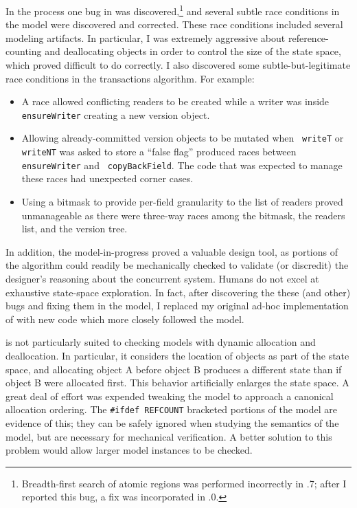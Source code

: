 In the process one bug in \Spin was discovered,\footnote{Breadth-first
search of atomic regions was performed incorrectly in .7;
after I reported this bug, a fix was incorporated in .0.}
and several subtle race conditions in the model were discovered and
corrected.  These race conditions included several modeling artifacts.
In particular, I was extremely aggressive about reference-counting and
deallocating objects in order to control the size of the state space,
which proved difficult to do correctly.  I also discovered some
subtle-but-legitimate race conditions in the transactions algorithm.
For example:
\begin{itemize}
\item A race allowed conflicting readers to be created while a writer
  was inside {\tt ensureWriter} creating a new version object.
\item Allowing already-committed version objects to be mutated when {\tt
    writeT} or {\tt writeNT} was asked to store a ``false flag'' produced
  races between {\tt ensureWriter} and {\tt
    copyBackField}.  The code that was expected to manage these races
  had unexpected corner cases.
\item Using a bitmask to provide per-field granularity
  to the list of readers proved unmanageable as there were three-way
  races among the bitmask, the readers list, and the version tree.
\end{itemize}
In addition, the model-in-progress proved a valuable design tool, as
portions of the algorithm could readily be mechanically checked to
validate (or discredit) the designer's reasoning about the concurrent
system.  Humans do not excel at exhaustive state-space exploration.
In fact, after discovering the these (and other) bugs and fixing them in the
model, I replaced my original ad-hoc implementation of \apex with new
code which more closely followed the model.

\Spin is not particularly suited to checking models with dynamic
allocation and deallocation.  In particular, it considers the
location of objects as part of the state space, and allocating object
A before object B produces a different state than if object B
were allocated first.  This behavior artificially enlarges the
state space.  A great deal of effort was expended tweaking the
model to approach a canonical allocation ordering.  The
\texttt{\#ifdef REFCOUNT} bracketed portions of the model are evidence
of this; they
can be safely ignored when studying the semantics of the model, but
are necessary for mechanical verification.  A better solution
to this problem would allow larger model instances to be checked.


